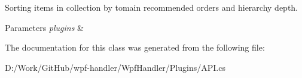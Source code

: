 Sorting items in collection by tomain recommended orders and hierarchy depth. 


\begin{DoxyParams}{Parameters}
{\em plugins} & \\
\hline
\end{DoxyParams}


The documentation for this class was generated from the following file\+:\begin{DoxyCompactItemize}
\item 
D\+:/\+Work/\+Git\+Hub/wpf-\/handler/\+Wpf\+Handler/\+Plugins/A\+P\+I.\+cs\end{DoxyCompactItemize}
